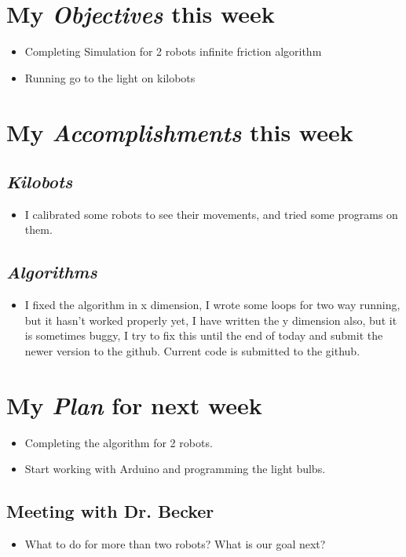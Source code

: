 \newcommand{\handoutName}{Weekly report}
\newcommand{\handoutdate}{\today}


\section{My \emph{Objectives} this week}
\begin{itemize}
\item Completing Simulation for 2 robots infinite friction algorithm
\item Running go to the light on kilobots
\end{itemize}



\section{My \emph{Accomplishments} this week}

\subsection{\emph{Kilobots}}

\begin{itemize}
\item I calibrated some robots to see their movements, and tried some programs on them.
\end{itemize}

\subsection{\emph{Algorithms}}

\begin{itemize}
\item I fixed the algorithm in x dimension, I wrote some loops for two way running, but it hasn't worked properly yet, I have written the y dimension also, but it is sometimes buggy, I try to fix this until the end of today and submit the newer version to the github. Current code is submitted to the github. 
\end{itemize}





\section{My \emph{Plan} for next week}

\begin{itemize}
\item Completing the algorithm for 2 robots.
\item Start working with Arduino and programming the light bulbs.

\end{itemize}

\subsection{Meeting with Dr. Becker  }

\begin{itemize}
\item What to do for more than two robots? What is our goal next?
\end{itemize}


